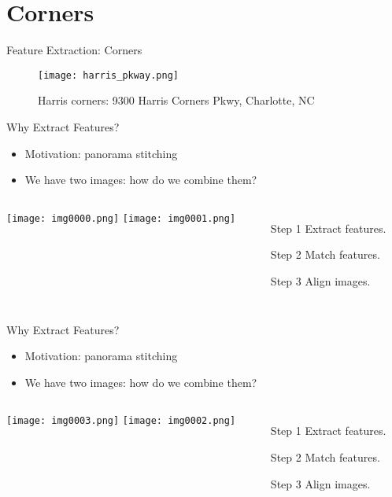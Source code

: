 

\section{Corners}



\begin{frame}{Feature Extraction: Corners}
    \begin{figure}
      \centering
      \texttt{[image: harris\_pkway.png]}
      \caption{ Harris corners: 9300 Harris Corners Pkwy, Charlotte, NC}\label{fi:harris_pkway}
    \end{figure}
\end{frame}


\begin{frame}{Why Extract Features?}
    \begin{itemize}[<+->]
        \item Motivation: panorama stitching
        \item We have two images: how do we combine them?
    \end{itemize}
    \begin{columns}
        {
            \centering
            \texttt{[image: img0000.png]}
            \texttt{[image: img0001.png]}
        }
        \begin{itemize}[<+->]
            \item[Step 1] Extract features.
            \item[Step 2] Match features.
            \item[Step 3] Align images.
        \end{itemize}
    \end{columns}
\end{frame}

\begin{frame}{Why Extract Features?}
    \begin{itemize}
        \item Motivation: panorama stitching
        \item We have two images: how do we combine them?
    \end{itemize}
    \begin{columns}
        {
            \centering
            \texttt{[image: img0003.png]}
            \texttt{[image: img0002.png]}
        }
        \begin{itemize}
            \item[Step 1] Extract features.
            \item[Step 2] Match features.
            \item[Step 3] Align images.
        \end{itemize}
    \end{columns}
\end{frame}

